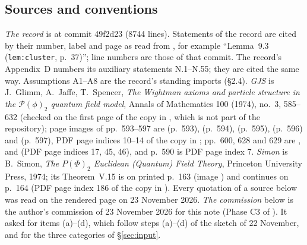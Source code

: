 \documentclass[11pt,a4paper]{article}
\theoremstyle{plain}
\theoremstyle{definition}
\begin{document}
\subsection{Sources and conventions}

\emph{The record} is  at commit 49f2d23 (8744 lines).  Statements of the
record are cited by their number, label and page as read from , for
example ``Lemma~9.3 (\texttt{lem:cluster}, p.~37)''; line numbers are those of that commit.
The record's Appendix~D numbers its auxiliary statements N.1--N.55; they are cited the same
way.  Assumptions A1--A8 are the record's standing imports (\S2.4).  \emph{GJS} is
J.~Glimm, A.~Jaffe, T.~Spencer, \emph{The Wightman axioms and particle structure in the
$\mathscr P(\phi)_2$ quantum field model}, Annals of Mathematics 100 (1974), no.~3, 585--632
(checked on the first page of the copy in , which is not part of the repository);
page images of pp.~593--597 are  (p.~593),
 (p.~594),  (p.~595),
 (p.~596) and  (p.~597), PDF page indices
10--14 of the copy in ; pp.~600, 628 and 629 are ,
 and  (PDF page indices 17, 45, 46), and
p.~590 is PDF page index 7.  \emph{Simon} is B.~Simon, \emph{The $P(\Phi)_2$
Euclidean (Quantum) Field Theory}, Princeton University Press, 1974; its Theorem~V.15 is on
printed p.~163 (image ) and continues on p.~164
(PDF page index 186 of the copy in ).  Every quotation of a source below was read
on the rendered page on 23 November 2026.  \emph{The commission} below is the author's
commission of 23 November 2026 for this note (Phase C3 of ).  It asked for
items (a)--(d), which follow steps (a)--(d) of the sketch of 22 November, and for the three
categories of \S\ref{sec:input}.
\end{document}
